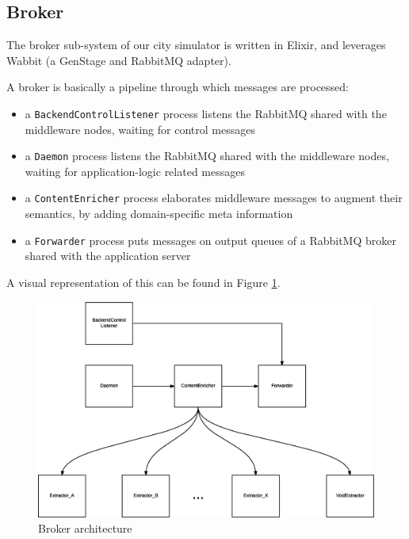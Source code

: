 \subsection{Broker}\label{sec:impl-broker}

The broker sub-system of our city simulator is written in Elixir, and leverages
Wabbit (a GenStage and RabbitMQ adapter).

A broker is basically a pipeline through which messages are processed:

\begin{itemize}
  \item a \texttt{BackendControlListener} process listens the RabbitMQ shared
    with the middleware nodes, waiting for control messages
  \item a \texttt{Daemon} process listens the RabbitMQ shared with the
    middleware nodes, waiting for application-logic related messages
  \item a \texttt{ContentEnricher} process elaborates middleware messages to
    augment their semantics, by adding domain-specific meta information
  \item a \texttt{Forwarder} process puts messages on output queues of a
    RabbitMQ broker shared with the application server
\end{itemize}

A visual representation of this can be found in Figure \ref{fig:broker-arch}.

\begin{figure}[H]
  \centering
  \includegraphics[width=\columnwidth]{images/implementation/broker.eps}
  \caption{Broker architecture}
  \label{fig:broker-arch}
\end{figure}

